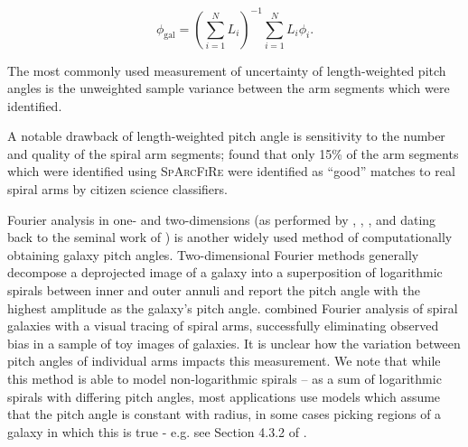 \begin{equation}
  \phi_\mathrm{gal} = \left(\sum_{i=1}^{N}L_i\right)^{-1}\sum_{i=1}^{N}L_i \phi_i.
\end{equation}

The most commonly used measurement of uncertainty of length-weighted pitch angles is the unweighted sample variance between the arm segments which were identified.

A notable drawback of length-weighted pitch angle is sensitivity to the number and quality of the spiral arm segments; \citet{2017MNRAS.472.2263H} found that only 15\% of the arm segments which were identified using \textsc{SpArcFiRe} \citep{2014ApJ...790...87D} were identified as ``good'' matches to real spiral arms by citizen science classifiers.

Fourier analysis in one- and two-dimensions (as performed by \citealt{2019arXiv190804246D}, \citealt{2012ApJS..199...33D}, \citealt{2018MNRAS.474.2594M}, and dating back to the seminal work of \citealt{ConsidereAthanassoula1988}) is another widely used method of computationally obtaining galaxy pitch angles. Two-dimensional Fourier methods generally decompose a deprojected image of a galaxy into a superposition of logarithmic spirals between inner and outer annuli \citep{2012ApJS..199...33D} and report the pitch angle with the highest amplitude as the galaxy's pitch angle. \citet{2020MNRAS.493.3854H} combined Fourier analysis of spiral galaxies with a visual tracing of spiral arms, successfully eliminating observed bias in a sample of toy images of galaxies. It is unclear how the variation between pitch angles of individual arms impacts this measurement. We note that while this method is able to model non-logarithmic spirals -- as a sum of logarithmic spirals with differing pitch angles, most applications use models which assume that the pitch angle is constant with radius, in some cases picking regions of a galaxy in which this is true - e.g. see Section 4.3.2 of \citealt{2012ApJS..199...33D}.

